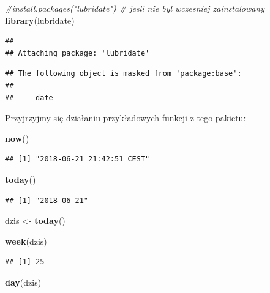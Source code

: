 \documentclass[]{book}
\newenvironment{Shaded}{\begin{snugshade}}{\end{snugshade}}
\newcommand{\KeywordTok}[1]{\textcolor[rgb]{0.13,0.29,0.53}{\textbf{#1}}}
\newcommand{\StringTok}[1]{\textcolor[rgb]{0.31,0.60,0.02}{#1}}
\newcommand{\CommentTok}[1]{\textcolor[rgb]{0.56,0.35,0.01}{\textit{#1}}}
\newcommand{\NormalTok}[1]{#1}
\theoremstyle{definition}
\theoremstyle{definition}
\theoremstyle{definition}
\theoremstyle{remark}
\begin{document}
\begin{Shaded}
\begin{Highlighting}[]
\CommentTok{#install.packages("lubridate") # jesli nie byl wczesniej zainstalowany}
\KeywordTok{library}\NormalTok{(lubridate)}
\end{Highlighting}
\end{Shaded}

\begin{verbatim}
## 
## Attaching package: 'lubridate'
\end{verbatim}

\begin{verbatim}
## The following object is masked from 'package:base':
## 
##     date
\end{verbatim}

Przyjrzyjmy się działaniu przykładowych funkcji z tego pakietu:

\begin{Shaded}
\begin{Highlighting}[]
\KeywordTok{now}\NormalTok{()}
\end{Highlighting}
\end{Shaded}

\begin{verbatim}
## [1] "2018-06-21 21:42:51 CEST"
\end{verbatim}

\begin{Shaded}
\begin{Highlighting}[]
\KeywordTok{today}\NormalTok{()}
\end{Highlighting}
\end{Shaded}

\begin{verbatim}
## [1] "2018-06-21"
\end{verbatim}

\begin{Shaded}
\begin{Highlighting}[]
\NormalTok{dzis <-}\StringTok{ }\KeywordTok{today}\NormalTok{()}

\KeywordTok{week}\NormalTok{(dzis)}
\end{Highlighting}
\end{Shaded}

\begin{verbatim}
## [1] 25
\end{verbatim}

\begin{Shaded}
\begin{Highlighting}[]
\KeywordTok{day}\NormalTok{(dzis)}
\end{Highlighting}
\end{Shaded}
\end{document}
